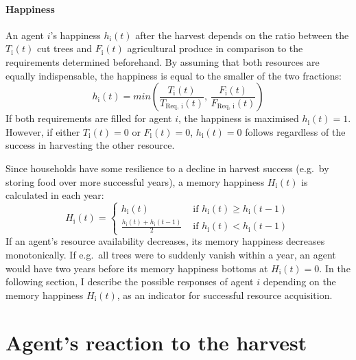 \paragraph{Happiness}
An agent $i$'s happiness $h_\text{i}(t)$ after the harvest depends on the ratio between the $T_\text{i}(t)$ cut trees and $F_\text{i}(t)$ agricultural produce in comparison to the requirements determined beforehand.
By assuming that both resources are equally indispensable, the happiness is equal to the smaller of the two fractions:
\begin{equation} 
h_\text{i}(t) = min \left( \frac{T_\text{i}(t)}{T_\text{Req, i}(t)}, \, \frac{F_\text{i}(t)}{F_\text{Req, i}(t)} \right)
\label{eq:h_i}
\end{equation}
If both requirements are filled for agent $i$, the happiness is maximised $h_\text{i}(t)=1$.
However, if either $T_\text{i}(t)=0$ or $F_\text{i}(t)=0$, $h_\text{i}(t)=0$ follows regardless of the success in harvesting the other resource.

Since households have some resilience to a decline in harvest success (e.g.\ by storing food over more successful years), a memory happiness $H_\text{i}(t)$ is calculated in each year:
\begin{equation}
H_\text{i}(t) = \begin{cases} 
				h_\text{i}(t) & \text{ if } h_\text{i}(t)\geq h_\text{i}(t-1) \\
				\frac{h_\text{i}(t) + h_\text{i}(t-1)}{2} & \text{ if } h_\text{i}(t)<h_\text{i}(t-1) 
		\end{cases}
\end{equation}
If an agent's resource availability decreases, its memory happiness decreases monotonically.
If e.g.\ all trees were to suddenly vanish within a year, an agent would have two years before its memory happiness bottoms at $H_\text{i}(t) = 0$.
In the following section, I describe the possible responses of agent $i$ depending on the memory happiness $H_\text{i}(t)$, as an indicator for successful resource acquisition.




\section{Agent's reaction to the harvest}\label{sec:Reaction} 
